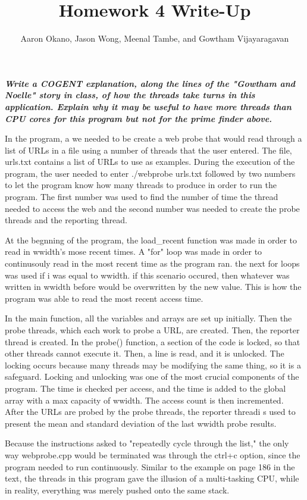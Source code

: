 \documentclass[12pt,letterpaper]{article}
\title{Homework 4 Write-Up}
\author{Aaron Okano, Jason Wong, Meenal Tambe, and Gowtham Vijayaragavan}
\begin{document}
\setcounter{page}{1}
\textit{\textbf{Write a COGENT explanation, along the lines of the "Gowtham and Noelle" story in class, of how the threads take turns in this application. Explain why it may be useful to have more threads than CPU cores for this program but not for the prime finder above.}}
\newline

\linespread{1.5}
In the program, a we needed to be create a web probe that would read through a list of URLs in a file using a number of threads that the user entered. The file, urls.txt contains a list of URLs to use as examples. During the execution of the program, the user needed to enter ./webprobe urls.txt followed by two numbers to let the program know how many threads to produce in order to run the program. The first number was used to find the number of time the thread needed to access the web and the second number was needed to create the probe threads and the reporting thread. 

At the begnning of the program, the load\_recent function was made in order to read in wwidth's mose recent times. A "for" loop was made in order to continusouly read in the most recent time as the program ran. the next for loops was used if i was equal to wwidth. if this scenario occured, then whatever was written in wwidth before would be overwritten by the new value. This is how the program was able to read the most recent access time. 

In the main function, all the variables and arrays are set up initially. Then the probe threads, which each work to probe a URL, are created. Then, the reporter thread is created. In the probe() function, a section of the code is locked, so that other threads cannot execute it. Then, a line is read, and it is unlocked. The locking occurs because many threads may be modifying the same thing, so it is a safeguard. Locking and unlocking was one of the most crucial components of the program. The time is checked per access, and the time is added to the global array with a max capacity of wwidth.  The access count is then incremented. After the URLs are probed by the probe threads, the reporter threadi s used to present the mean and standard deviation of the last wwidth probe results.

Because the instructions asked to "repeatedly cycle through the list," the only way webprobe.cpp would be terminated was through the ctrl+c option, since the program needed to run continuously. Similar to the example on page 186 in the text, the threads in this program gave the illusion of a multi-tasking CPU, while in reality, everything was merely pushed onto the same stack. 
\end{document}
